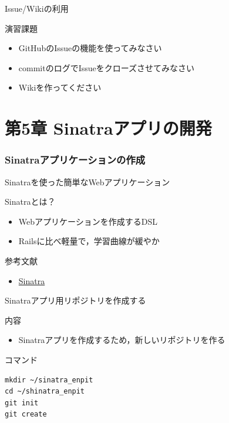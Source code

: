 \documentclass[t, aspectratio=169]{beamer}
\begin{document}
\begin{frame}[label=sec-4-4-4]{Issue/Wikiの利用}
\begin{block}{演習課題}
\begin{itemize}
\item GitHubのIssueの機能を使ってみなさい
\item commitのログでIssueをクローズさせてみなさい
\item Wikiを作ってください
\end{itemize}
\end{block}
\end{frame}

\part{第5章 Sinatraアプリの開発}
\label{sec-5}
\section{Sinatraアプリケーションの作成}
\label{sec-5-1}
\begin{frame}[label=sec-5-1-1]{Sinatraを使った簡単なWebアプリケーション}
\begin{block}{Sinatraとは？}
\begin{itemize}
\item Webアプリケーションを作成するDSL
\item Railsに比べ軽量で，学習曲線が緩やか
\end{itemize}
\end{block}

\begin{block}{参考文献}
\begin{itemize}
\item \href{http://www.sinatrarb.com/}{Sinatra}
\end{itemize}
\end{block}
\end{frame}
\begin{frame}[fragile,label=sec-5-1-2]{Sinatraアプリ用リポジトリを作成する}
 \begin{block}{内容}
\begin{itemize}
\item Sinatraアプリを作成するため，新しいリポジトリを作る
\end{itemize}
\end{block}

\begin{block}{コマンド}
\begin{verbatim}
mkdir ~/sinatra_enpit
cd ~/shinatra_enpit
git init
git create
\end{verbatim}
\end{block}
\end{frame}
\end{document}
